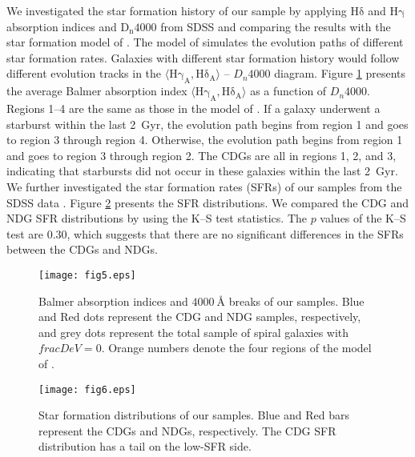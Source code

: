 \documentclass[fleqn,usenatbib]{mnras}
\begin{document}
We investigated the star formation history of our sample by applying $\mathrm{H\delta}$ and $\mathrm{H\gamma}$ absorption indices and $\mathrm{D_n 4000}$ from SDSS \citep[][]{2004MNRAS.351.1151B} and comparing the results with the star formation model of \citet{2015MNRAS.451..433H}.
The model of \citet{2015MNRAS.451..433H} simulates the evolution paths of different star formation rates.
Galaxies with different star formation history would follow different evolution tracks in the $\langle \mathrm{H\gamma_A,H\delta_A}\rangle$ -- $D_n 4000$ diagram.
Figure \ref{fig5} presents the average Balmer absorption index $\langle \mathrm{H\gamma_A,H\delta_A}\rangle$ as a function of $D_n 4000$.
Regions 1--4 are the same as those in the model of \citet{2015MNRAS.451..433H}.
If a galaxy underwent a starburst within the last 2~Gyr, the evolution path begins from region 1 and goes to region 3 through region 4.
Otherwise, the evolution path begins from region 1 and goes to region 3 through region 2.
The CDGs are all in regions 1, 2, and 3, indicating that starbursts did not occur in these galaxies within the last 2~Gyr.
We further investigated the star formation rates (SFRs) of our samples from the SDSS data \citep{2003MNRAS.341...33K}.
Figure \ref{fig6} presents the SFR distributions.
We compared the CDG and NDG SFR distributions by using the K--S test statistics.
The $p$ values of the K--S test are 0.30, which suggests that there are no significant differences in the SFRs between the CDGs and NDGs.
\begin{figure}
        \texttt{[image: fig5.eps]}
    \caption{Balmer absorption indices and $4000~\text{\AA}$ breaks of our samples.
    Blue and Red dots represent the CDG and NDG samples, respectively, and grey dots represent the total sample of spiral galaxies with $fracDeV=0$. Orange numbers denote the four regions of the model of \citet{2015MNRAS.451..433H}.}
    \label{fig5}
\end{figure}

\begin{figure}
        \texttt{[image: fig6.eps]}
    \caption{Star formation distributions of our samples.
    Blue and Red bars represent the CDGs and NDGs, respectively.
    The CDG SFR distribution has a tail on the low-SFR side.}
    \label{fig6}
\end{figure}
\end{document}
